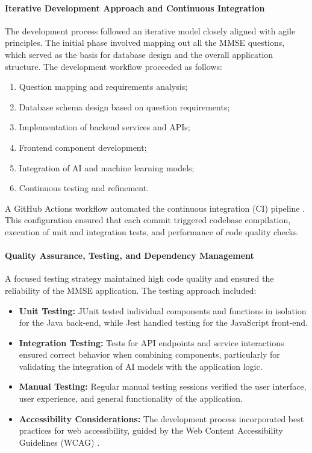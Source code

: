 \paragraph{Iterative Development Approach and Continuous Integration}
The development process followed an iterative model closely aligned with agile principles. The initial phase involved mapping out all the MMSE questions, which served as the basis for database design and the overall application structure. The development workflow proceeded as follows:
\begin{enumerate}
\item Question mapping and requirements analysis;
\item Database schema design based on question requirements;
\item Implementation of backend services and APIs;
\item Frontend component development;
\item Integration of AI and machine learning models;
\item Continuous testing and refinement.
\end{enumerate}

A GitHub Actions workflow automated the continuous integration (CI) pipeline \cite{github_actions}. This configuration ensured that each commit triggered codebase compilation, execution of unit and integration tests, and performance of code quality checks.

\paragraph{Quality Assurance, Testing, and Dependency Management}
A focused testing strategy maintained high code quality and ensured the reliability of the MMSE application. The testing approach included:
\begin{itemize}
\item \textbf{Unit Testing:} JUnit tested individual components and functions in isolation for the Java back-end, while Jest handled testing for the JavaScript front-end.
\item \textbf{Integration Testing:} Tests for API endpoints and service interactions ensured correct behavior when combining components, particularly for validating the integration of AI models with the application logic.
\item \textbf{Manual Testing:} Regular manual testing sessions verified the user interface, user experience, and general functionality of the application.
\item \textbf{Accessibility Considerations:} The development process incorporated best practices for web accessibility, guided by the Web Content Accessibility Guidelines (WCAG) \cite{wcag}.
\end{itemize}

